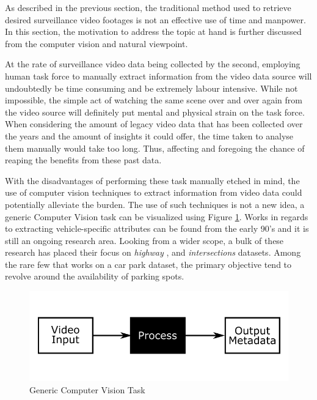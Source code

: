 As described in the previous section, the traditional method used to retrieve desired surveillance video footages is not an effective use of time and manpower. In this section, the motivation to address the topic at hand is further discussed from the computer vision and natural viewpoint.


At the rate of surveillance video data being collected by the second, employing human task force to manually extract information from the video data source will undoubtedly be time consuming and be extremely labour intensive.
While not impossible, the simple act of watching the same scene over and over again from the video source will definitely put mental and physical strain on the task force. When considering the amount of legacy video data that has been collected over the years and the amount of insights it could offer, the time taken to analyse them manually would take too long. Thus, affecting and foregoing the chance of reaping the benefits from these past data.

With the disadvantages of performing these task manually etched in mind, the use of computer vision techniques to extract information from video data could potentially alleviate the burden. The use of such techniques is not a new idea, a generic Computer Vision task can be visualized using Figure \ref{fig:genericCV}. Works in regards to extracting vehicle-specific attributes can be found from the early 90's and it is still an ongoing research area. Looking from a wider scope, a bulk of these research has placed their focus on \textit{highway} \cite{yu2017improved, cao2016vehicle, arya2016real, liu2016highway, al2016adaptive}, and  \textit{intersections} \cite{meng2017traffic, choong2017modeling, ren2018learning} datasets. Among the rare few \cite{shi2017study, marmol2016quickspot, ling2017identifying} that works on a car park dataset, the primary objective tend to revolve around the availability of parking spots.

\begin{figure}[!hbt]\centering
\includegraphics[width=.8\textwidth]{image/general/simpleframe.png}
\caption{Generic Computer Vision Task}
\label{fig:genericCV}
\end{figure}

